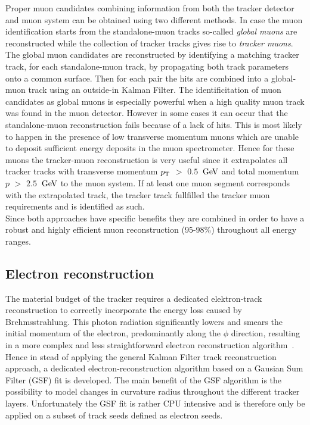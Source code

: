 Proper muon candidates combining information from both the tracker detector and muon system can be obtained using two different methods. In case the muon identification starts from the standalone-muon tracks so-called \textit{global muons} are reconstructed while the collection of tracker tracks gives rise to \textit{tracker muons}.
The global muon candidates are reconstructed by identifying a matching tracker track, for each standalone-muon track, by propagating both track parameters onto a common surface. Then for each pair the hits are combined into a global-muon track using an outside-in Kalman Filter. The identificitation of muon candidates as global muons is especially powerful when a high quality muon track was found in the muon detector. However in some cases it can occur that the standalone-muon reconstruction fails because of a lack of hits. This is most likely to happen in the presence of low transverse momentum muons which are unable to deposit sufficient energy deposits in the muon spectrometer. Hence for these muons the tracker-muon reconstruction is very useful since it extrapolates all tracker tracks with transverse momentum $p_{\rm T}$ $>$ $0.5$ $\, \mathrm{GeV}$ and total momentum $p$ $>$ $2.5$ $\, \mathrm{GeV}$ to the muon system. If at least one muon segment corresponds with the extrapolated track, the tracker track fullfilled the tracker muon requirements and is identified as such.
\\
Since both approaches have specific benefits they are combined in order to have a robust and highly efficient muon reconstruction (95-98$\%$) throughout all energy ranges. 
 
\subsection{Electron reconstruction} \label{subsec::Electron}

The material budget of the tracker requires a dedicated elektron-track reconstruction to correctly incorporate the energy loss caused by Brehmsstrahlung. 
This photon radiation significantly lowers and smears the initial momentum of the electron, predominantly along the $\phi$ direction, resulting in a more complex and less straightforward electron reconstruction algorithm~\cite{}.
Hence in stead of applying the general Kalman Filter track reconstruction approach, a dedicated electron-reconstruction algorithm based on a Gausian Sum Filter (GSF) fit is developed. The main benefit of the GSF algorithm is the possibility to model changes in curvature radius throughout the different tracker layers. 
Unfortunately the GSF fit is rather CPU intensive and is therefore only be applied on a subset of track seeds defined as electron seeds.

